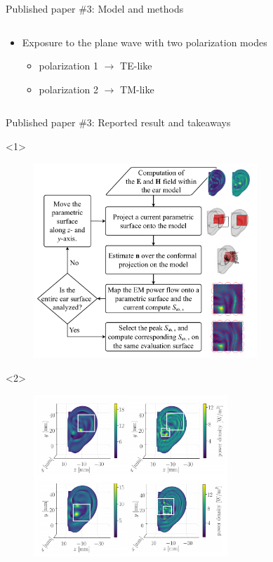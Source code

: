 \documentclass[xcolor=dvipsnames,10pt]{beamer}
\begin{document}
\begin{frame}{Published paper \#3: Model and methods}
\begin{columns}[c]
\begin{column}{0.6\textwidth}
\begin{itemize}
\begin{itemize}
                \end{itemize}
                \item<2> Exposure to the plane wave with two polarization modes
                \begin{itemize}
                    \item polarization 1 $\rightarrow$ TE-like
                    \item polarization 2 $\rightarrow$ TM-like
                \end{itemize}
            \end{itemize}
        \end{column}
    \end{columns}  
\end{frame}

\begin{frame}{Published paper \#3: Reported result and takeaways}
    \begin{onlyenv}<1>
        \begin{center}
            \begin{figure}
                \includegraphics[width=0.75\textwidth]{artwork/IEEE-JERM-detection.pdf}
            \end{figure}
        \end{center}
    \end{onlyenv}
    \begin{onlyenv}<2>
        \begin{figure}
            \centering
            \includegraphics[width=0.65\textwidth]{artwork/IEEE-JERM-pd.pdf}

\end{figure}
\end{onlyenv}
\end{frame}
\end{document}
